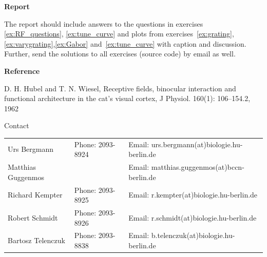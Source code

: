 \documentclass[12pt, a4]{article}
\begin{document}
{\bf Report}

The report should include answers to the questions in exercises
\ref{ex:RF_questions}, \ref{ex:tune_curve} and plots from
exercises~\ref{ex:grating},\ref{ex:varygrating},\ref{ex:Gabor}
and~\ref{ex:tune_curve} with caption and discussion.
Further, send the solutions to all exercises (source code) by email as well.

\vspace{1cm}
{\bf Reference}

D. H. Hubel and T. N. Wiesel, Receptive fields, binocular interaction
and functional architecture in the cat's visual cortex, J Physiol.
160(1): 106–154.2, 1962

\vfill
\centerline{\CAP Contact}
\CAP

\begin{tabular}{lll}
Urs Bergmann & Phone: 2093-8924 & Email:
urs.bergmann(at)biologie.hu-berlin.de \\
Matthias Guggenmos & & Email: matthias.guggenmos(at)bccn-berlin.de \\
Richard Kempter \hfill & Phone: 2093-8925 \hfill & Email:
r.kempter(at)biologie.hu-berlin.de \\
Robert Schmidt & Phone: 2093-8926 & Email: r.schmidt(at)biologie.hu-berlin.de
\\
Bartosz Telenczuk & Phone: 2093-8838 & Email:
b.telenczuk(at)biologie.hu-berlin.de \\
\end{tabular}
\end{document}
